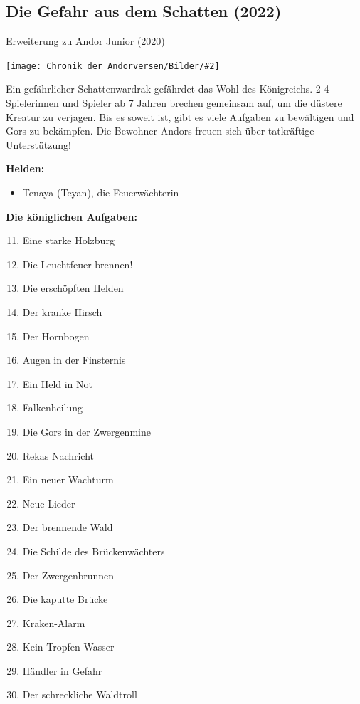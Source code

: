 \documentclass[10pt, a4paper, oneside]{book}
\newcommand{\fillbreak}{\vspace*{\fill}\columnbreak}
\newcommand{\produkt}[1]{%
    \section{#1}%
    \label{Produkt: #1}%
}
\newcommand{\refprodukt}[1]{\hyperref[Produkt: #1]{#1}}
\newcommand{\bildmitts}[2][height=0.32\textwidth,width=0.48\textwidth,keepaspectratio]{%
    \begin{center}
        \texttt{[image: Chronik der Andorversen/Bilder/\#2]}
    \end{center}
}
\begin{document}
\begin{multicols}{2}
  
\fillbreak
\produkt{Die Gefahr aus dem Schatten (2022)}

\begin{center}
    Erweiterung zu \refprodukt{Andor Junior (2020)}
\end{center}

\bildmitts{Die Gefahr aus dem Schatten (2022).png}

Ein gefährlicher Schattenwardrak gefährdet das Wohl des Königreichs. 2-4 Spielerinnen und Spieler ab 7 Jahren brechen gemeinsam auf, um die düstere Kreatur zu verjagen. Bis es soweit ist, gibt es viele Aufgaben zu bewältigen und Gors zu bekämpfen. Die Bewohner Andors freuen sich über tatkräftige Unterstützung!\bigskip

\textbf{Helden:}
\begin{itemize}[topsep=0pt,itemsep=-1ex,partopsep=1ex,parsep=1ex]
    \item Tenaya (Teyan), die Feuerwächterin\bigskip
\end{itemize}

\textbf{Die königlichen Aufgaben:}


\begin{enumerate}[topsep=0pt,itemsep=-1ex,partopsep=1ex,parsep=1ex]
    \setcounter{enumi}{10}
    \item Eine starke Holzburg
    \item Die Leuchtfeuer brennen!
    \item Die erschöpften Helden
    \item Der kranke Hirsch
    \item Der Hornbogen
    \item Augen in der Finsternis
    \item Ein Held in Not
    \item Falkenheilung
    \item Die Gors in der Zwergenmine
    \item Rekas Nachricht
    \item Ein neuer Wachturm
    \item Neue Lieder
    \item Der brennende Wald
    \item Die Schilde des Brückenwächters
    \item Der Zwergenbrunnen
    \item Die kaputte Brücke
    \item Kraken-Alarm
    \item Kein Tropfen Wasser
    \item Händler in Gefahr
    \item Der schreckliche Waldtroll
\end{enumerate}
 


\end{multicols}
\end{document}
